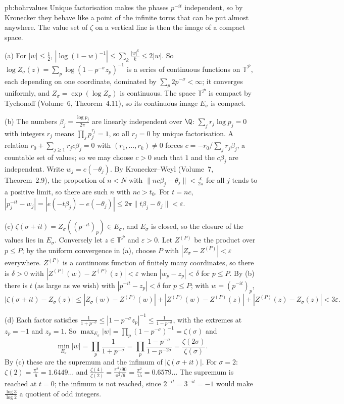 \begin{solution}{pb:bohrvalues}
\idea Unique factorisation makes the phases $p^{-it}$ independent, so by Kronecker they behave like a point of the infinite torus that can be put almost anywhere. The
value set of $\zeta$ on a vertical line is then the image of a compact space.

\writeup (a) For $|w|\le\frac12$, $|\log(1-w)^{-1}|\le\sum_k\frac{|w|^k}k\le2|w|$. So $\log Z_\sigma(z)=\sum_p\log(1-p^{-\sigma}z_p)^{-1}$ is a series of continuous functions on
$\mathbb T^{\mathcal P}$, each depending on one coordinate, dominated by $\sum_p2p^{-\sigma}<\infty$; it converges uniformly, and $Z_\sigma=\exp(\log Z_\sigma)$ is continuous. The space
$\mathbb T^{\mathcal P}$ is compact by Tychonoff (Volume~6, Theorem~4.11), so its continuous image $E_\sigma$ is compact.

(b) The numbers $\beta_j=\frac{\log p_j}{2\pi}$ are linearly independent over $\Q$: $\sum_jr_j\log p_j=0$ with integers $r_j$ means $\prod_jp_j^{r_j}=1$, so all $r_j=0$ by unique
factorisation. A relation $r_0+\sum_{j\ge1}r_jc\beta_j=0$ with $(r_1,\dots,r_k)\ne0$ forces $c=-r_0/\sum_jr_j\beta_j$, a countable set of values; so we may choose $c>0$ such that $1$
and the $c\beta_j$ are independent. Write $w_j=e(-\theta_j)$. By Kronecker--Weyl (Volume~7, Theorem~2.9), the proportion of $n<N$ with $\|nc\beta_j-\theta_j\|<\frac\varepsilon{2\pi}$ for all $j$
tends to a positive limit, so there are such $n$ with $nc>t_0$. For $t=nc$, $|p_j^{-it}-w_j|=|e(-t\beta_j)-e(-\theta_j)|\le2\pi\|t\beta_j-\theta_j\|<\varepsilon$.

(c) $\zeta(\sigma+it)=Z_\sigma((p^{-it})_p)\in E_\sigma$, and $E_\sigma$ is closed, so the closure of the values lies in $E_\sigma$. Conversely let $z\in\mathbb T^{\mathcal P}$ and
$\varepsilon>0$. Let $Z^{(P)}$ be the product over $p\le P$; by the uniform convergence in (a), choose $P$ with $|Z_\sigma-Z^{(P)}|<\varepsilon$ everywhere. $Z^{(P)}$ is a continuous
function of finitely many coordinates, so there is $\delta>0$ with $|Z^{(P)}(w)-Z^{(P)}(z)|<\varepsilon$ when $|w_p-z_p|<\delta$ for $p\le P$. By (b) there is $t$ (as large as we wish) with
$|p^{-it}-z_p|<\delta$ for $p\le P$; with $w=(p^{-it})_p$,
\[
|\zeta(\sigma+it)-Z_\sigma(z)|\le|Z_\sigma(w)-Z^{(P)}(w)|+|Z^{(P)}(w)-Z^{(P)}(z)|+|Z^{(P)}(z)-Z_\sigma(z)|<3\varepsilon.
\]

(d) Each factor satisfies $\frac1{1+p^{-\sigma}}\le|1-p^{-\sigma}z_p|^{-1}\le\frac1{1-p^{-\sigma}}$, with the extremes at $z_p=-1$ and $z_p=1$. So $\max_{E_\sigma}|w|=\prod_p(1-p^{-\sigma})^{-1}=\zeta(\sigma)$ and
\[
\min_{E_\sigma}|w|=\prod_p\frac1{1+p^{-\sigma}}=\prod_p\frac{1-p^{-\sigma}}{1-p^{-2\sigma}}=\frac{\zeta(2\sigma)}{\zeta(\sigma)}.
\]
By (c) these are the supremum and the infimum of $|\zeta(\sigma+it)|$. For $\sigma=2$: $\zeta(2)=\frac{\pi^2}6=1.6449\ldots$ and $\frac{\zeta(4)}{\zeta(2)}=\frac{\pi^4/90}{\pi^2/6}=\frac{\pi^2}{15}=0.6579\ldots$
The supremum is reached at $t=0$; the infimum is not reached, since $2^{-it}=3^{-it}=-1$ would make $\frac{\log3}{\log2}$ a quotient of odd integers.


\end{solution}
